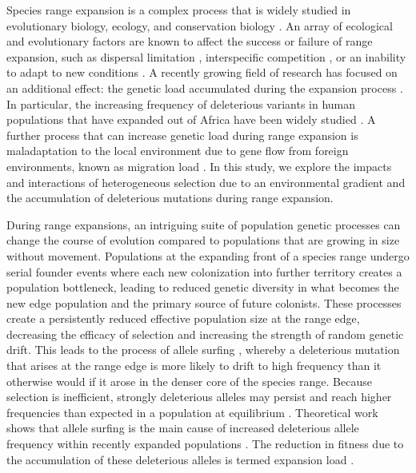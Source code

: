 Species range expansion is a complex process that is widely studied in evolutionary biology, ecology, and conservation biology \citep{Chen:2011, Colautti:2013, Hastings:2005, Phillips:2006, Excoffier:2009, Hallatschek:2010}. An array of ecological and evolutionary factors are known to affect the success or failure of range expansion, such as dispersal limitation \citep{Hargreaves:2014b, Marsico:2009, Hastings:2005}, interspecific competition \citep{Case:2000, Price:2009,Svenning:2014, Louthan:2015}, or an inability to adapt to new conditions \citep{Polechova:2015, Holt:2011, Angert:2008}. A recently growing field of research has focused on an additional effect: the genetic load accumulated during the expansion process \citep{Excoffier:2009, Hallatschek:2010, Peischl:2013, Peischl:2015, Peischl:2015b}. In particular, the increasing frequency of deleterious variants in human populations that have expanded out of Africa have been widely studied \citep{Henn:2015, Do:2015, Lohmueller:2008}. A further process that can increase genetic load during range expansion is maladaptation to the local environment due to gene flow from foreign environments, known as migration load \citep{Kirkpatrick:1997, Barton:2001, Polechova:2015}. In this study, we explore the impacts and interactions of heterogeneous selection due to an environmental gradient and the accumulation of deleterious mutations during range expansion.

During range expansions, an intriguing suite of population genetic processes can change the course of evolution compared to populations that are growing in size without movement. Populations at the expanding front of a species range undergo serial founder events where each new colonization into further territory creates a population bottleneck, leading to reduced genetic diversity in what becomes the new edge population and the primary source of future colonists. These processes create a persistently reduced effective population size at the range edge, decreasing the efficacy of selection and increasing the strength of random genetic drift. This leads to the process of allele surfing \citep{Klopfstein:2006}, whereby a deleterious mutation that arises at the range edge is more likely to drift to high frequency than it otherwise would if it arose in the denser core of the species range. Because selection is inefficient, strongly deleterious alleles may persist and reach higher frequencies than expected in a population at equilibrium \citep{Peischl:2015}. Theoretical work shows that allele surfing is the main cause of increased deleterious allele frequency within recently expanded populations \citep{Excoffier:2009}. The reduction in fitness due to the accumulation of these deleterious alleles is termed expansion load \citep{Peischl:2013,Peischl:2015}.

